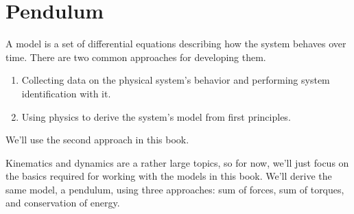\section{Pendulum} \label{sec:implementation_steps}

A \gls{model} is a set of differential equations describing how the \gls{system}
behaves over time. There are two common approaches for developing them.

\begin{enumerate}
  \item Collecting data on the physical system's behavior and performing
    \gls{system} identification with it.
  \item Using physics to derive the \gls{system}'s model from first principles.
\end{enumerate}

We'll use the second approach in this book.

Kinematics and dynamics are a rather large topics, so for now, we'll just focus
on the basics required for working with the \glspl{model} in this book. We'll
derive the same \gls{model}, a pendulum, using three approaches: sum of forces,
sum of torques, and conservation of energy.

